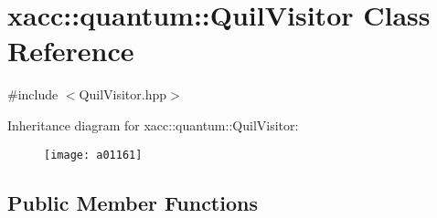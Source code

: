 \hypertarget{a01161}{}\section{xacc\+:\+:quantum\+:\+:Quil\+Visitor Class Reference}
\label{a01161}


{\ttfamily \#include $<$Quil\+Visitor.\+hpp$>$}

Inheritance diagram for xacc\+:\+:quantum\+:\+:Quil\+Visitor\+:\begin{figure}[H]
\begin{center}
\leavevmode
\texttt{[image: a01161]}
\end{center}
\end{figure}
\subsection*{Public Member Functions}
